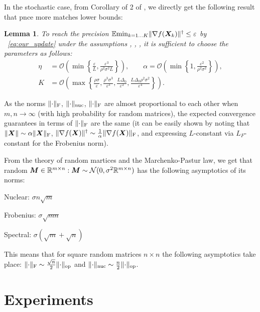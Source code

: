 \documentclass{article} %
\newtheorem{lemma}{Lemma}
\newcommand{\norm}[1]{\lVert #1\rVert}
\renewcommand{\epsilon}{\varepsilon}
\newcommand{\Rmn}{\R^{m\times n}}
\newcommand{\cN}{\mathcal{N}}
\newcommand{\cO}{\mathcal{O}}
\DeclarePairedDelimiter{\normf}{\|}{\|_\mathrm{F}}
\DeclarePairedDelimiter{\norms}{\|}{\|_{\mathrm{op}}}
\DeclarePairedDelimiter{\normn}{\|}{\|_{\mathrm{nuc}}}
\begin{document}
    In the stochastic case, from Corollary of 2 of \cite{kovalev2025understanding}, we directly get the following result that pnce more matches lower bounds:

    \begin{lemma}\label{lemma:stoch_tr}
    To reach the precision $\E{\min_{k=1\ldots K} \norm{\nabla f(\mX_k)}^\dagger} \leq \epsilon$ by ~\eqref{eq:our_update} under the assumptions , , , it is sufficient to choose the parameters as follows:
    \begin{align}
        \eta &= \cO\left(\min\left\{\frac{\epsilon}{L}, \frac{\epsilon^3}{\rho^2\sigma^2L}\right\}\right),
        \qquad
        \alpha = \cO\left(\min\left\{1, \frac{\epsilon^2}{\rho^2\sigma^2}\right\}\right),
        \\
        \label{eq:str_K_nonconvex}
        K &= \cO\left(\max\left\{
            \frac{\rho\sigma}{\epsilon},
            \frac{\rho^3\sigma^3}{\epsilon^3},
            \frac{L\Delta_0}{\epsilon^2},
            \frac{L\Delta_0\rho^2\sigma^2}{\epsilon^4}
        \right\}\right).
    \end{align}
    \end{lemma}

    As the norms $\normf{\cdot}$, $\normn{\cdot}$, $\normf{\cdot}$ are almost proportional to each other when $m, n \rightarrow \infty$ (with high probability for random matrices), the expected convergence guarantees in terms of $\normf{\cdot}$ are the same (it can be easily shown by noting that $\norm{\mX}\sim\alpha\normf{\mX}$, $\norm{\nabla f(\mX)}^\dagger \sim \frac{1}{\alpha} \normf{\nabla f(\mX)}$, and expressing $L$-constant via $L_F$-constant for the Frobenius norm).

    From the theory of random martices and the Marchenko-Pastur law, we get that random $\mM \in \Rmn: \mM \sim \cN(0, \sigma^2 \Rmn)$ has the following asymptotics of its norms:

    Nuclear: $\sigma n \sqrt{m}$

    Frobenius: $\sigma \sqrt{m n}$
    
    Spectral: $\sigma(\sqrt{m} + \sqrt{n})$

    This means that for square random matrices $n \times n$  the following asymptotics take place: $\normf{\cdot} \sim \frac{\sqrt{n}}{2}\norms{\cdot}$ and $\normn{\cdot} \sim \frac{n}{2}\norms{\cdot}$.


\section{Experiments}
\end{document}
